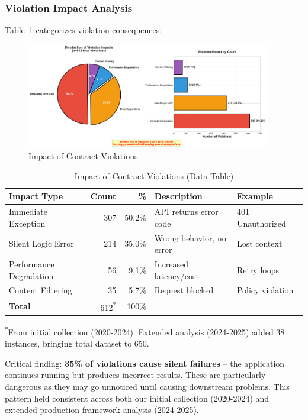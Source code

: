 \documentclass[11pt]{article}
\begin{document}
\subsubsection{Violation Impact Analysis}

Table~\ref{tab:violation_impact} categorizes violation consequences:

\begin{figure}[h]
\centering
\includegraphics[width=0.95\textwidth]{fig6_violation_impact.pdf}
\caption{Impact of Contract Violations}
\label{fig:violation_impact}
\end{figure}

\begin{table}[h]
\centering
\caption{Impact of Contract Violations (Data Table)}
\label{tab:violation_impact}
\begin{tabular}{lrrp{5cm}l}
\toprule
\textbf{Impact Type} & \textbf{Count} & \textbf{\%} & \textbf{Description} & \textbf{Example} \\
\midrule
Immediate Exception & 307 & 50.2\% & API returns error code & 401 Unauthorized~\cite{stackoverflow77896210} \\
Silent Logic Error & 214 & 35.0\% & Wrong behavior, no error & Lost context~\cite{githublangchain10316} \\
Performance Degradation & 56 & 9.1\% & Increased latency/cost & Retry loops \\
Content Filtering & 35 & 5.7\% & Request blocked & Policy violation~\cite{githubopenai331} \\
\midrule
\textbf{Total} & 612\textsuperscript{*} & 100\% & & \\
\bottomrule
\end{tabular}
\vspace{0.1cm}
\footnotesize{\textsuperscript{*}From initial collection (2020-2024). Extended analysis (2024-2025) added 38 instances, bringing total dataset to 650.}
\end{table}

Critical finding: \textbf{35\% of violations cause silent failures} -- the application continues running but produces incorrect results. These are particularly dangerous as they may go unnoticed until causing downstream problems. This pattern held consistent across both our initial collection (2020-2024) and extended production framework analysis (2024-2025).
\end{document}
